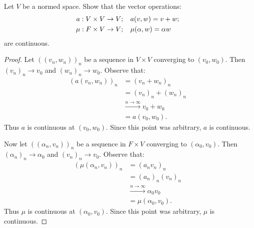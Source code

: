 \documentclass[11pt,twoside,openany]{memoir}
\begin{document}
    \begin{exercise}
        Let $V$ be a normed space. Show that the vector operations:
            \begin{equation*}
            \begin{split}
                a:V \times V &\rightarrow V; \h9 a(v,w) = v + w; \\
                \mu:F \times V &\rightarrow V; \h9 \mu(\alpha,w) = \alpha w
            \end{split}
            \end{equation*}
        are continuous.
    \end{exercise}
        \begin{proof}
            Let $((v_n,w_n))_n$ be a sequence in $V \times V$ converging to $(v_0,w_0) $. Then $(v_n)_n \rightarrow v_0$ and $(w_n)_n \rightarrow w_0$. Observe that:
                \begin{equation*}
                \begin{split}
                    (a(v_n,w_n))_n 
                    & = (v_n + w_n)_n \\
                    & = (v_n)_n + (w_n)_n \\
                    & \xrightarrow{n\rightarrow \infty} v_0 + w_0 \\
                    & = a(v_0,w_0).
                \end{split}
                \end{equation*}
            Thus $a$ is continuous at $(v_0,w_0)$. Since this point was arbitrary, $a$ is continuous.

            Now let $((\alpha_n,v_n))_n$ be a sequence in $F \times V$ converging to $(\alpha_0,v_0)$. Then $(\alpha_n)_n \rightarrow \alpha_0$ and $(v_n)_n \rightarrow v_0$. Observe that:
                \begin{equation*}
                \begin{split}
                    (\mu(\alpha_n,v_n))_n
                    & = (a_n v_n)_n \\
                    & = (a_n)_n (v_n)_n \\
                    & \xrightarrow{n \rightarrow \infty} \alpha_0 v_0 \\
                    & = \mu(\alpha_0,v_0).
                \end{split}
                \end{equation*}
            Thus $\mu$ is continuous at $(\alpha_0,v_0)$. Since this point was arbitrary, $\mu$ is continuous.
        \end{proof}
\end{document}
